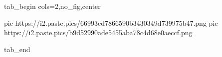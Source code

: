  
 
 
 
 


\ifcmt
  tab_begin cols=2,no_fig,center

     pic https://i2.paste.pics/66993cd7866590b3430349d739975b47.png
		 pic https://i2.paste.pics/b9d52990ade5455aba78c4d68e0aeccf.png

  tab_end
\fi
